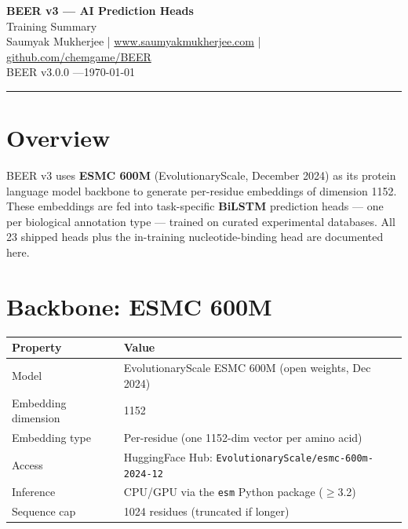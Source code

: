 \documentclass[11pt,a4paper]{article}
\begin{document}
\begin{center}
  {\LARGE\bfseries BEER v3 --- AI Prediction Heads}\\[4pt]
  {\large\color{beerblue} Training Summary}\\[8pt]
  {\normalsize Saumyak Mukherjee \quad|\quad
   \href{https://www.saumyakmukherjee.com}{www.saumyakmukherjee.com} \quad|\quad
   \href{https://github.com/chemgame/BEER}{github.com/chemgame/BEER}}\\[4pt]
  {\small\color{gray} BEER v3.0.0 \quad---\quad \today}
\end{center}

\vspace{4pt}\hrule\vspace{12pt}

\section{Overview}

BEER v3 uses \textbf{ESMC 600M} (EvolutionaryScale, December 2024) as its protein language model backbone to generate per-residue embeddings of dimension 1152. These embeddings are fed into task-specific \textbf{BiLSTM} prediction heads --- one per biological annotation type --- trained on curated experimental databases. All 23 shipped heads plus the in-training nucleotide-binding head are documented here.

\section{Backbone: ESMC 600M}

\begin{tabular}{L{4.5cm} L{9.5cm}}
\toprule
\textbf{Property} & \textbf{Value} \\
\midrule
Model & EvolutionaryScale ESMC 600M (open weights, Dec 2024) \\
Embedding dimension & 1152 \\
Embedding type & Per-residue (one 1152-dim vector per amino acid) \\
Access & HuggingFace Hub: \texttt{EvolutionaryScale/esmc-600m-2024-12} \\
Inference & CPU/GPU via the \texttt{esm} Python package ($\geq$3.2) \\
Sequence cap & 1024 residues (truncated if longer) \\
\bottomrule
\end{tabular}
\end{document}
